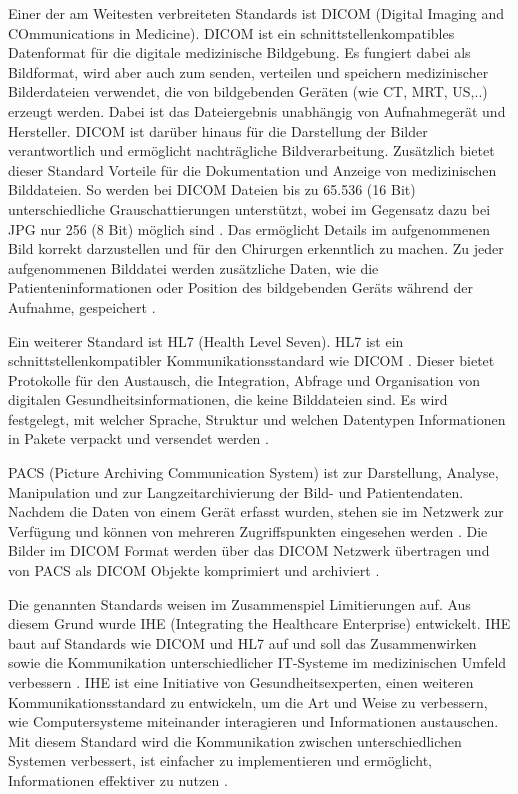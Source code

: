 Einer der am Weitesten verbreiteten Standards ist DICOM (Digital Imaging and COmmunications in Medicine). DICOM ist ein schnittstellenkompatibles Datenformat für die digitale medizinische Bildgebung. Es fungiert dabei als Bildformat, wird aber auch zum senden, verteilen und speichern medizinischer Bilderdateien verwendet, die von bildgebenden Geräten (wie CT, MRT, US,..) erzeugt werden. Dabei ist das Dateiergebnis unabhängig von Aufnahmegerät und Hersteller. DICOM ist darüber hinaus für die Darstellung der Bilder verantwortlich und ermöglicht nachträgliche Bildverarbeitung. Zusätzlich bietet dieser Standard Vorteile für die Dokumentation und Anzeige von medizinischen Bilddateien. So werden bei DICOM Dateien bis zu 65.536 (16 Bit) unterschiedliche Grauschattierungen unterstützt, wobei im Gegensatz dazu bei JPG nur 256 (8 Bit) möglich sind \cite{DICOM}. Das ermöglicht Details im aufgenommenen Bild korrekt darzustellen und für den Chirurgen erkenntlich zu machen. Zu jeder aufgenommenen Bilddatei werden zusätzliche Daten, wie die Patienteninformationen oder Position des bildgebenden Geräts während der Aufnahme, gespeichert \cite{DICOM}.

Ein weiterer Standard ist HL7 (Health Level Seven). HL7 ist ein schnittstellenkompatibler Kommunikationsstandard wie DICOM \cite{DerDigitaleOperationssaal}. Dieser bietet Protokolle für den Austausch, die Integration, Abfrage und Organisation von digitalen Gesundheitsinformationen, die keine Bilddateien sind. Es wird festgelegt, mit welcher Sprache, Struktur und welchen Datentypen Informationen in Pakete verpackt und versendet werden \cite{HL7}.

PACS (Picture Archiving Communication System) ist zur Darstellung, Analyse, Manipulation und zur Langzeitarchivierung der Bild- und Patientendaten. Nachdem die Daten von einem Gerät erfasst wurden, stehen sie im Netzwerk zur Verfügung und können von mehreren Zugriffspunkten eingesehen werden \cite{PACS}.
Die Bilder im DICOM Format werden über das DICOM Netzwerk übertragen und von PACS als DICOM Objekte komprimiert und archiviert \cite{DICOM}.

Die genannten Standards weisen im Zusammenspiel Limitierungen auf. Aus diesem Grund wurde IHE (Integrating the Healthcare Enterprise) entwickelt. IHE baut auf Standards wie DICOM und HL7 auf und soll das Zusammenwirken sowie die Kommunikation unterschiedlicher IT-Systeme im medizinischen Umfeld verbessern \cite{DICOMundIHE}. 
IHE ist eine Initiative von Gesundheitsexperten, einen weiteren Kommunikationsstandard zu entwickeln, um die Art und Weise zu verbessern, wie Computersysteme miteinander interagieren und Informationen austauschen. Mit diesem Standard wird die Kommunikation zwischen unterschiedlichen Systemen verbessert, ist einfacher zu implementieren und ermöglicht, Informationen effektiver zu nutzen \cite{IHE}.

